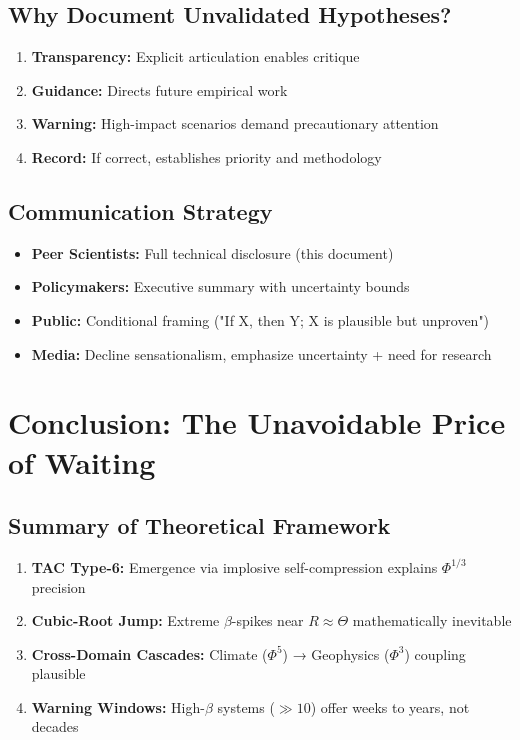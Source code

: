 \documentclass[11pt,a4paper]{article}
\begin{document}
\subsection{Why Document Unvalidated Hypotheses?}

\begin{enumerate}
\item \textbf{Transparency:} Explicit articulation enables critique
\item \textbf{Guidance:} Directs future empirical work
\item \textbf{Warning:} High-impact scenarios demand precautionary attention
\item \textbf{Record:} If correct, establishes priority and methodology
\end{enumerate}

\subsection{Communication Strategy}

\begin{itemize}
\item \textbf{Peer Scientists:} Full technical disclosure (this document)
\item \textbf{Policymakers:} Executive summary with uncertainty bounds
\item \textbf{Public:} Conditional framing ("If X, then Y; X is plausible but unproven")
\item \textbf{Media:} Decline sensationalism, emphasize uncertainty + need for research
\end{itemize}

\section{Conclusion: The Unavoidable Price of Waiting}

\subsection{Summary of Theoretical Framework}

\begin{enumerate}
\item \textbf{TAC Type-6:} Emergence via implosive self-compression explains $\Phi^{1/3}$ precision
\item \textbf{Cubic-Root Jump:} Extreme $\beta$-spikes near $R \approx \Theta$ mathematically inevitable
\item \textbf{Cross-Domain Cascades:} Climate ($\Phi^5$) → Geophysics ($\Phi^3$) coupling plausible
\item \textbf{Warning Windows:} High-$\beta$ systems ($\gg 10$) offer weeks to years, not decades
\end{enumerate}
\end{document}
